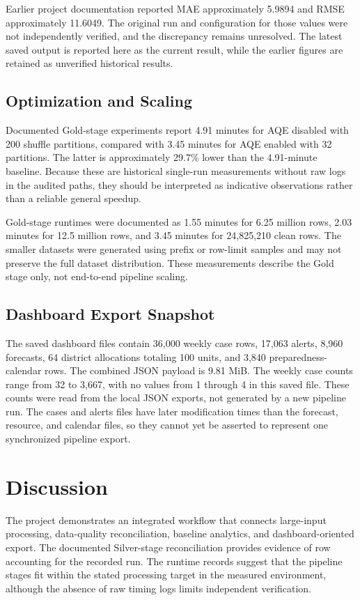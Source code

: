 \documentclass[conference]{IEEEtran}
\begin{document}
Earlier project documentation reported MAE approximately 5.9894 and RMSE approximately 11.6049. The original run and configuration for those values were not independently verified, and the discrepancy remains unresolved. The latest saved output is reported here as the current result, while the earlier figures are retained as unverified historical results.

\subsection{Optimization and Scaling}

Documented Gold-stage experiments report 4.91 minutes for AQE disabled with 200 shuffle partitions, compared with 3.45 minutes for AQE enabled with 32 partitions. The latter is approximately 29.7\% lower than the 4.91-minute baseline. Because these are historical single-run measurements without raw logs in the audited paths, they should be interpreted as indicative observations rather than a reliable general speedup.

Gold-stage runtimes were documented as 1.55 minutes for 6.25 million rows, 2.03 minutes for 12.5 million rows, and 3.45 minutes for 24,825,210 clean rows. The smaller datasets were generated using prefix or row-limit samples and may not preserve the full dataset distribution. These measurements describe the Gold stage only, not end-to-end pipeline scaling.

\subsection{Dashboard Export Snapshot}

The saved dashboard files contain 36,000 weekly case rows, 17,063 alerts, 8,960 forecasts, 64 district allocations totaling 100 units, and 3,840 preparedness-calendar rows. The combined JSON payload is 9.81 MiB. The weekly case counts range from 32 to 3,667, with no values from 1 through 4 in this saved file. These counts were read from the local JSON exports, not generated by a new pipeline run. The cases and alerts files have later modification times than the forecast, resource, and calendar files, so they cannot yet be asserted to represent one synchronized pipeline export.

\section{Discussion}

The project demonstrates an integrated workflow that connects large-input processing, data-quality reconciliation, baseline analytics, and dashboard-oriented export. The documented Silver-stage reconciliation provides evidence of row accounting for the recorded run. The runtime records suggest that the pipeline stages fit within the stated processing target in the measured environment, although the absence of raw timing logs limits independent verification.
\end{document}
